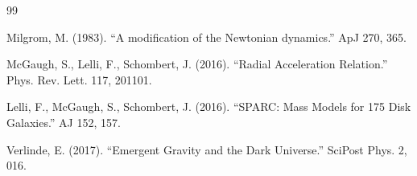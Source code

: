 \documentclass[12pt,a4paper]{article}
\begin{document}
\begin{thebibliography}{99}

Milgrom, M. (1983). ``A modification of the Newtonian dynamics.'' ApJ 270, 365.

McGaugh, S., Lelli, F., Schombert, J. (2016). ``Radial Acceleration Relation.'' Phys. Rev. Lett. 117, 201101.

Lelli, F., McGaugh, S., Schombert, J. (2016). ``SPARC: Mass Models for 175 Disk Galaxies.'' AJ 152, 157.

Verlinde, E. (2017). ``Emergent Gravity and the Dark Universe.'' SciPost Phys. 2, 016.

\end{thebibliography}
\end{document}
